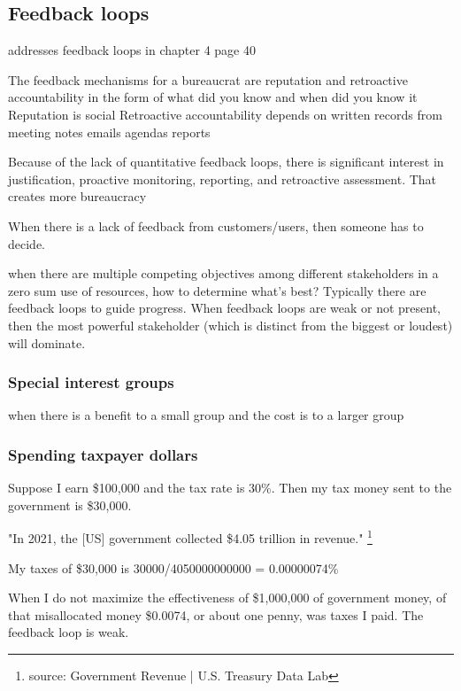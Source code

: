 \subsection{Feedback loops}

\cite{1983_Lipsky} addresses feedback loops in chapter 4 page 40

The feedback mechanisms for a bureaucrat are reputation and retroactive accountability in the form of what did you know and when did you know it
Reputation is social
Retroactive accountability depends on written records from meeting notes emails agendas reports


Because of the lack of quantitative feedback loops, there is significant interest in justification, proactive monitoring, reporting, and retroactive assessment. That creates more bureaucracy


When there is a lack of feedback from customers/users, then someone has to decide.


when there are multiple competing objectives among different stakeholders in a zero sum use of resources, how to determine what's best? Typically there are feedback loops to guide progress. When feedback loops are weak or not present, then the most powerful stakeholder (which is distinct from the biggest or loudest) will dominate. 

\subsubsection{Special interest groups}

when there is a benefit to a small group and the cost is to a larger group

\subsubsection{Spending taxpayer dollars}

Suppose I earn \$100,000 and the tax rate is 30\%. Then my tax money sent to the government is \$30,000.

"In 2021, the [US] government collected \$4.05 trillion in revenue."
\footnote{source: Government Revenue | U.S. Treasury Data Lab}

My taxes of \$30,000 is
30000/4050000000000 = 0.00000074\%

When I do not maximize the effectiveness of \$1,000,000 of government money, of that misallocated money \$0.0074, or about one penny, was taxes I paid. The feedback loop is weak.

